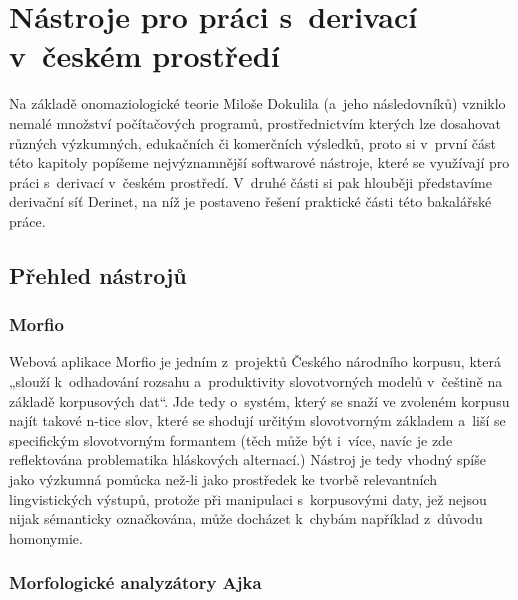 \hypertarget{nuxe1stroje-pro-pruxe1ci-s-derivacuxed-v-ux10deskuxe9m-prostux159eduxed}{%
\chapter{Nástroje pro práci s~derivací v~českém
prostředí}\label{nuxe1stroje-pro-pruxe1ci-s-derivacuxed-v-ux10deskuxe9m-prostux159eduxed}}

Na základě onomaziologické teorie Miloše Dokulila (a~jeho následovníků)
vzniklo nemalé množství počítačových programů, prostřednictvím kterých
lze dosahovat různých výzkumných, edukačních či komerčních výsledků,
proto si v~první část této kapitoly popíšeme nejvýznamnější softwarové
nástroje, které se využívají pro práci s~derivací v~českém prostředí.
V~druhé části si pak hlouběji představíme derivační síť Derinet, na níž je
postaveno řešení praktické části této bakalářské práce.

\hypertarget{pux159ehled-nuxe1strojux16f}{%
\section{Přehled nástrojů}\label{pux159ehled-nuxe1strojux16f}}

\hypertarget{morfio}{%
\subsection{Morfio}\label{morfio}}

Webová aplikace Morfio je jedním z~projektů Českého národního korpusu,
která „slouží k~odhadování rozsahu a~produktivity slovotvorných modelů
v~češtině na základě korpusových dat``. Jde tedy o~systém, který se snaží
ve zvoleném korpusu najít takové n-tice slov, které se shodují určitým
slovotvorným základem a~liší se specifickým slovotvorným formantem (těch
může být i~více, navíc je zde reflektována problematika hláskových
alternací.) Nástroj je tedy vhodný spíše jako výzkumná pomůcka než-li
jako prostředek ke tvorbě relevantních lingvistických výstupů, protože
při manipulaci s~korpusovými daty, jež nejsou nijak sémanticky
označkována, může docházet k~chybám například z~důvodu homonymie.
\parencite{cvrcek13}

\hypertarget{morfologickuxe9-analyzuxe1tory-ajka}{%
\subsection{Morfologické analyzátory
Ajka}\label{morfologickuxe9-analyzuxe1tory-ajka}}

